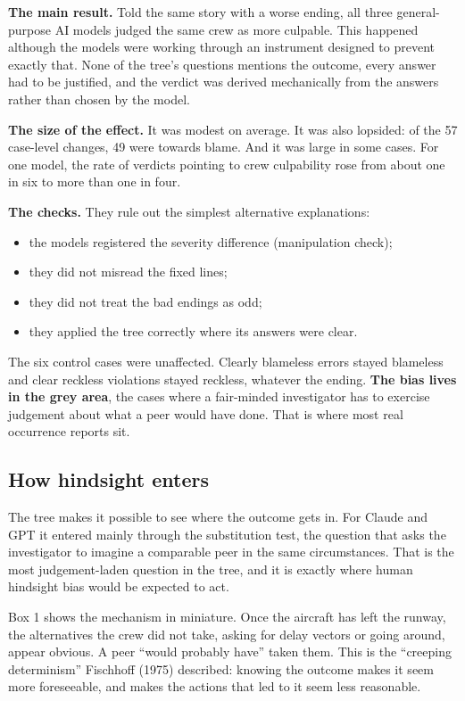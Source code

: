 \documentclass[review,12pt]{elsarticle}
\providecommand{\tightlist}{\setlength{\itemsep}{0pt}\setlength{\parskip}{0pt}}
\begin{document}
\textbf{The main result.} Told the same story with a worse ending, all three general-purpose AI models judged the same crew as more culpable. This happened although the models were working through an instrument designed to prevent exactly that. None of the tree's questions mentions the outcome, every answer had to be justified, and the verdict was derived mechanically from the answers rather than chosen by the model.

\textbf{The size of the effect.} It was modest on average. It was also lopsided: of the 57 case-level changes, 49 were towards blame. And it was large in some cases. For one model, the rate of verdicts pointing to crew culpability rose from about one in six to more than one in four.

\textbf{The checks.} They rule out the simplest alternative explanations:

\begin{itemize}
\tightlist
\item
  the models registered the severity difference (manipulation check);
\item
  they did not misread the fixed lines;
\item
  they did not treat the bad endings as odd;
\item
  they applied the tree correctly where its answers were clear.
\end{itemize}

The six control cases were unaffected. Clearly blameless errors stayed blameless and clear reckless violations stayed reckless, whatever the ending. \textbf{The bias lives in the grey area}, the cases where a fair-minded investigator has to exercise judgement about what a peer would have done. That is where most real occurrence reports sit.

\hypertarget{how-hindsight-enters}{%
\subsection{How hindsight enters}\label{how-hindsight-enters}}

The tree makes it possible to see where the outcome gets in. For Claude and GPT it entered mainly through the substitution test, the question that asks the investigator to imagine a comparable peer in the same circumstances. That is the most judgement-laden question in the tree, and it is exactly where human hindsight bias would be expected to act.

Box 1 shows the mechanism in miniature. Once the aircraft has left the runway, the alternatives the crew did not take, asking for delay vectors or going around, appear obvious. A peer ``would probably have'' taken them. This is the ``creeping determinism'' Fischhoff (1975) described: knowing the outcome makes it seem more foreseeable, and makes the actions that led to it seem less reasonable.
\end{document}
